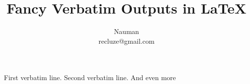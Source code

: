 \documentclass{article}
\begin{document}
\title{Fancy Verbatim Outputs in \LaTeX}
\author{Nauman \\ recluze@gmail.com}
\maketitle



First verbatim line. 
Second verbatim line. 
And even more


\end{document}
